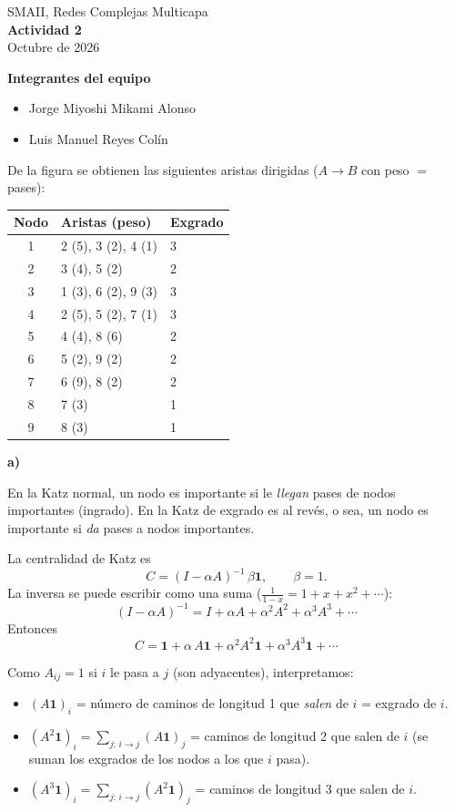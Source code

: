 \documentclass[11pt]{article}
\begin{document}
\begin{center}
	{\small SMAII, Redes Complejas Multicapa}\\[6pt]
	{\Large\bfseries Actividad 2}\\[3pt]
	{\small Octubre de 2026}
\end{center}

\textbf{Integrantes del equipo}
\begin{itemize}
    \item Jorge Miyoshi Mikami Alonso
    \item Luis Manuel Reyes Colín 
\end{itemize}

De la figura se obtienen las siguientes aristas dirigidas ($A \to B$ con peso $=$ pases):

\begin{center}
\begin{tabular}{cll}
\toprule
Nodo & Aristas (peso) & Exgrado \\
\midrule
1 & 2 (5), 3 (2), 4 (1) & 3 \\
2 & 3 (4), 5 (2)        & 2 \\
3 & 1 (3), 6 (2), 9 (3) & 3 \\
4 & 2 (5), 5 (2), 7 (1) & 3 \\
5 & 4 (4), 8 (6)        & 2 \\
6 & 5 (2), 9 (2)        & 2 \\
7 & 6 (9), 8 (2)        & 2 \\
8 & 7 (3)               & 1 \\
9 & 8 (3)               & 1 \\
\bottomrule
\end{tabular}
\end{center}

\textbf{a)}

En la Katz normal, un nodo es importante si le \emph{llegan} pases de nodos importantes (ingrado). En la Katz de exgrado es al revés, o sea, un nodo es importante si \emph{da} pases a nodos importantes.

La centralidad de Katz es
\[
C = (I - \alpha A)^{-1}\,\beta\mathbf{1}, \qquad \beta = 1 .
\]
La inversa se puede escribir como una suma ($\tfrac{1}{1-x} = 1 + x + x^2 + \cdots$):
\[
(I - \alpha A)^{-1} = I + \alpha A + \alpha^2 A^2 + \alpha^3 A^3 + \cdots
\]
Entonces
\[
C = \mathbf{1} + \alpha\,A\mathbf{1} + \alpha^2 A^2\mathbf{1} + \alpha^3 A^3\mathbf{1} + \cdots
\]

Como $A_{ij}=1$ si $i$ le pasa a $j$ (son adyacentes), interpretamos: 
\begin{itemize}
  \item $(A\mathbf{1})_i$ = número de caminos de longitud 1 que \emph{salen} de $i$ = exgrado de $i$.
  \item $(A^2\mathbf{1})_i = \sum_{j:\, i\to j} (A\mathbf{1})_j$ = caminos de longitud 2 que salen de $i$
        (se suman los exgrados de los nodos a los que $i$ pasa).
  \item $(A^3\mathbf{1})_i = \sum_{j:\, i\to j} (A^2\mathbf{1})_j$ = caminos de longitud 3 que salen de $i$.
\end{itemize}
\end{document}
